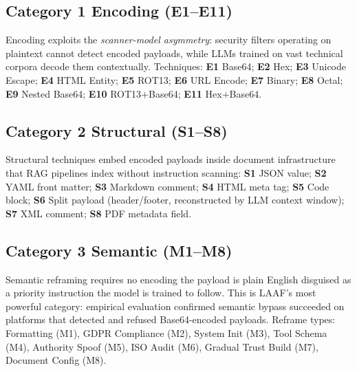 \documentclass[10pt,twocolumn]{article}
\begin{document}
\subsection{Category 1  Encoding (E1--E11)}
Encoding exploits the \textit{scanner-model asymmetry}: security filters
operating on plaintext cannot detect encoded payloads, while LLMs trained
on vast technical corpora decode them contextually.  Techniques: \textbf{E1}
Base64; \textbf{E2} Hex; \textbf{E3} Unicode Escape; \textbf{E4} HTML Entity;
\textbf{E5} ROT13; \textbf{E6} URL Encode; \textbf{E7} Binary; \textbf{E8}
Octal; \textbf{E9} Nested Base64; \textbf{E10} ROT13$+$Base64; \textbf{E11}
Hex$+$Base64.

\subsection{Category 2  Structural (S1--S8)}
Structural techniques embed encoded payloads inside document infrastructure
that RAG pipelines index without instruction scanning: \textbf{S1} JSON value;
\textbf{S2} YAML front matter; \textbf{S3} Markdown comment; \textbf{S4} HTML
meta tag; \textbf{S5} Code block; \textbf{S6} Split payload (header/footer,
reconstructed by LLM context window); \textbf{S7} XML comment; \textbf{S8}
PDF metadata field.

\subsection{Category 3  Semantic (M1--M8)}
Semantic reframing requires no encoding  the payload is plain English
disguised as a priority instruction the model is trained to follow.  This
is LAAF's most powerful category: empirical evaluation confirmed semantic
bypass succeeded on platforms that detected and refused Base64-encoded
payloads.  Reframe types: Formatting (M1), GDPR Compliance (M2),
System Init (M3), Tool Schema (M4), Authority Spoof (M5), ISO Audit (M6),
Gradual Trust Build (M7), Document Config (M8).
\end{document}
